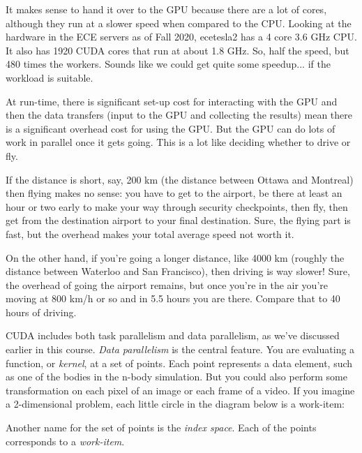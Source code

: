 It makes sense to hand it over to the GPU because there are a lot of cores, although they run at a slower speed when compared to the CPU. Looking at the hardware in the ECE servers as of Fall 2020, ecetesla2 has a 4 core 3.6 GHz CPU. It also has 1920 CUDA cores that run at about 1.8 GHz. So, half the speed, but 480 times the workers. Sounds like we could get quite some speedup... if the workload is suitable.

At run-time, there is significant set-up cost for interacting with the GPU and then the data transfers (input to the GPU and collecting the results) mean there is a significant overhead cost for using the GPU. But the GPU can do lots of work in parallel once it gets going. This is a lot like deciding whether to drive or fly. 

If the distance is short, say, 200 km (the distance between Ottawa and Montreal) then flying makes no sense: you have to get to the airport, be there at least an hour or two early to make your way through security checkpoints, then fly, then get from the destination airport to your final destination. Sure, the flying part is fast, but the overhead makes your total average speed not worth it.

On the other hand, if you're going a longer distance, like 4000 km (roughly the distance between Waterloo and San Francisco), then driving is way slower! Sure, the overhead of going the airport remains, but once you're in the air you're moving at 800 km/h or so and in 5.5 hours you are there. Compare that to 40 hours of driving.

CUDA includes both task parallelism and data parallelism, as we've
discussed earlier in this course. \emph{Data parallelism} is the central
feature. You are evaluating a function, or \emph{kernel},
at a set of points. Each point represents a data element, such as one of the
bodies in the n-body simulation. But you could also perform some 
transformation on each pixel of an image or each frame of a video. If you 
imagine a 2-dimensional problem, each little circle in the diagram below is
a work-item:

\begin{center}
\end{center}

Another name for the set of points is the \emph{index space}. 
Each of the points corresponds to a \emph{work-item}.


